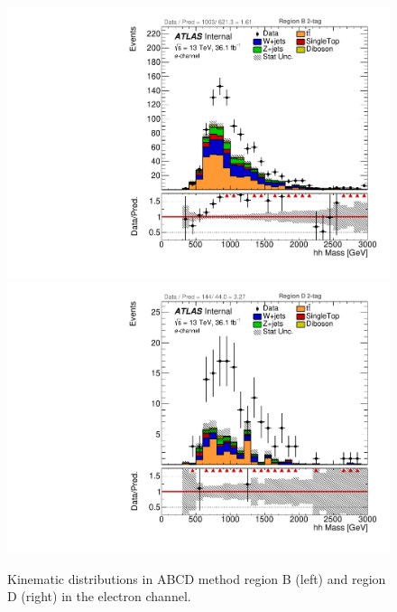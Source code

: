 \begin{figure}[!htbp]
\begin{center}
\includegraphics[scale=0.23]{./figures/boosted/ABCD/elec_Inc_RegionB_hhMass}
\includegraphics[scale=0.23]{./figures/boosted/ABCD/elec_Inc_RegionD_hhMass}
\caption{Kinematic distributions in ABCD method region B (left) and region D (right) in the electron channel.}
\label{fig:boosted_abcd_region_bd_elec}
\end{center}
\end{figure}

